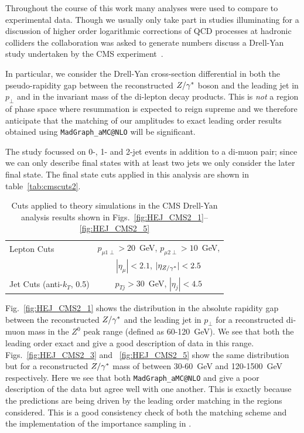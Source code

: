 		Throughout the course of this work many analyses were used to compare \hej to experimental
		data.  Though we usually only take part in studies illuminating for a discussion of higher order
		logarithmic corrections of QCD processes at hadronic colliders the \hej collaboration was asked to
		generate numbers discuss a Drell-Yan study undertaken by the CMS experiment~\cite{CMS:2014vtk}.

		In particular, we consider
		the Drell-Yan cross-section differential in both the pseudo-rapidity gap between the reconstructed
		$Z/\gamma^*$ boson and the leading jet in $p_\perp$ and in the invariant mass of the di-lepton decay
		products.  This is \emph{not} a region of phase space where resummation is expected to reign
		supreme and we therefore anticipate that the matching of our \hej amplitudes to exact leading
		order results obtained using \texttt{MadGraph\_aMC@NLO} will be significant.

		The study focussed on 0-, 1- and 2-jet events in addition to a di-muon pair; since we can
		only describe final states with at least two jets we only consider the later final state.  The
		final state cuts applied in this analysis are shown in table~\eqref{tab:cmscuts2}.

		\begin{table}[hbt]
		  \centering
		  \begin{tabular}{|l|c|}
		    \hline
		    Lepton Cuts & $p_{\mu1\perp}>20$~GeV, \; $p_{\mu2\perp}>10$~GeV, \\
		    & \; $|\eta_\mu|<2.1$, \; $|\eta_{Z/\gamma^*}|<2.5$ \\ \hline
		    Jet Cuts (anti-$k_T$, 0.5) & $p_{Tj}>30$~GeV, \; $|\eta_j|<4.5$ \\ \hline
		  \end{tabular}
		  \caption{Cuts applied to theory simulations in the CMS
		   Drell-Yan analysis results shown in
		    Figs.~\eqref{fig:HEJ_CMS2_1}--\eqref{fig:HEJ_CMS2_5}}
		  \label{tab:cmscuts2}
		\end{table}

		Fig.~\eqref{fig:HEJ_CMS2_1} shows the distribution in the absolute rapidity gap
		between the reconstructed $Z/\gamma^*$ and the leading jet in $p_\perp$ for a reconstructed
		di-muon mass in the $Z^0$ peak range (defined as 60-120~GeV).  We see that both the
		leading order exact and \HEJ give a good description of data in this range.
		Figs.~\eqref{fig:HEJ_CMS2_3} and ~\eqref{fig:HEJ_CMS2_5} show the same distribution
		but for a reconstructed $Z/\gamma^*$ mass of between 30-60~GeV and 120-1500~GeV respectively.
		Here we see that both \texttt{MadGraph\_aMC@NLO} and \HEJ give a poor description of the data but
		agree well with one another.  This is exactly because the \HEJ predictions are being
		driven by the leading order matching in the regions considered.  This is a good
		consistency check of both the \hej matching scheme and the implementation of the
		importance sampling in \HEJ.

